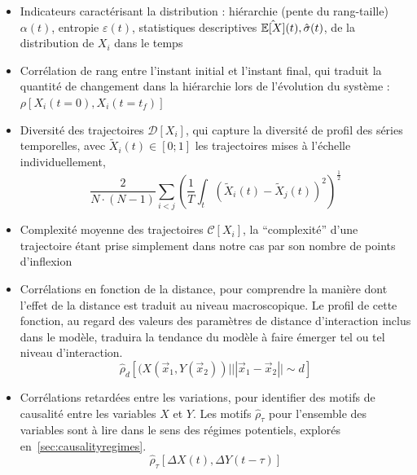 \begin{itemize}
  \item Indicateurs caractérisant la distribution : hiérarchie (pente du rang-taille) $\alpha (t)$, entropie $\varepsilon (t)$, statistiques descriptives $\hat{\operatorname{\mathbb{E}}\!\left[X\right]} (t), \hat{\sigma} (t)$, de la distribution de $X_i$ dans le temps
  \item Corrélation de rang entre l'instant initial et l'instant final, qui traduit la quantité de changement dans la hiérarchie lors de l'évolution du système : $\rho\left[X_i(t=0),X_i(t=t_f)\right]$
  \item Diversité des trajectoires $\mathcal{D}\left[X_i\right]$, qui capture la diversité de profil des séries temporelles, avec $\tilde{X}_i(t)\in \left[0;1\right]$ les trajectoires mises à l'échelle individuellement,
\[
\frac{2}{N\cdot(N-1)}\sum_{i<j} \left(\frac{1}{T}\int_{t} \left(\tilde{X}_i(t) - \tilde{X}_j(t)\right)^2 \right)^{\frac{1}{2}}
\]
\item Complexité moyenne des trajectoires $\mathcal{C}\left[X_i\right]$, la ``complexité'' d'une trajectoire étant prise simplement dans notre cas par son nombre de points d'inflexion 
\item Corrélations en fonction de la distance, pour comprendre la manière dont l'effet de la distance est traduit au niveau macroscopique. Le profil de cette fonction, au regard des valeurs des paramètres de distance d'interaction inclus dans le modèle, traduira la tendance du modèle à faire émerger tel ou tel niveau d'interaction.
\[
\hat{\rho}_d\left[(X(\vec{x}_1,Y(\vec{x}_2))|||\vec{x}_1-\vec{x}_2||\sim d\right]
\]
\item Corrélations retardées entre les variations, pour identifier des motifs de causalité entre les variables $X$ et $Y$. Les motifs $\hat{\rho}_{\tau}$ pour l'ensemble des variables sont à lire dans le sens des régimes potentiels, explorés en~\ref{sec:causalityregimes}.
\[
\hat{\rho}_{\tau}\left[\Delta X(t),\Delta Y(t-\tau)\right]
\]
\end{itemize}

